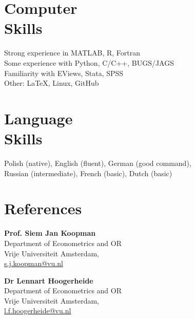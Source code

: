 \documentclass[margin,line]{resume}
\newlength\Colsep
\begin{document}
\begin{resume}


 
 	

   \section{\mysidestyle Computer\\ Skills} 
   Strong experience in MATLAB, R, Fortran   \vspace{1mm}\\
   Some experience with Python, C/C++, BUGS/JAGS \vspace{1mm}\\
	Familiarity with EViews, Stata, SPSS \vspace{1mm} \\
	Other: \LaTeX, Linux, GitHub  

   \section{\mysidestyle Language\\ Skills}  
	Polish (native), English (fluent),  German (good command),    \\
    Russian (intermediate),  French (basic),  Dutch (basic)

     
\section{\mysidestyle References} 

\noindent
\begin{minipage}[t][6cm][t]{\dimexpr0.5\textwidth-0.5\Colsep\relax}
\textbf{Prof. Siem Jan Koopman} \\    
Department of Econometrics and OR\\
Vrije Universiteit Amsterdam, \\ \url{s.j.koopman@vu.nl}
\vspace{5mm}

\textbf{Dr Lennart Hoogerheide} \\  
Department of Econometrics and OR \\  
Vrije Universiteit Amsterdam,\\ \url{l.f.hoogerheide@vu.nl}
\vspace{5mm}


\end{minipage}
\end{resume}
\end{document}
